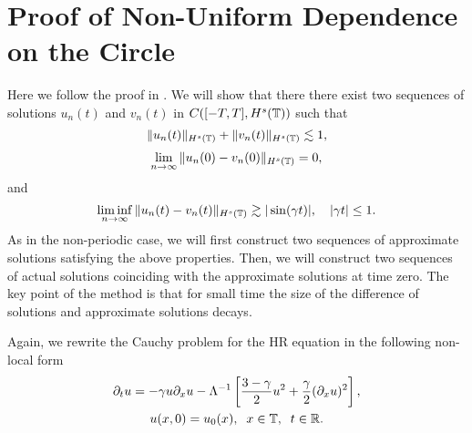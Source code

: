 \section{Proof of Non-Uniform Dependence 
on the Circle}
\label{sec:3}
%
Here we follow the proof in \cite{Himonas:2010}. 
We will show that there there exist two sequences of solutions 
$u_n(t)$
and $v_n(t)$ in $C([-T, T], H^s(\mathbb{T}))$ such that
%
%
%
%
\begin{equation}
\| u_n(t)  \|_{H^s(\mathbb{T})}
+
\| v_n(t)  \|_{H^s(\mathbb{T})}
\lesssim
1,
\end{equation}
%
%
%
%
%
\begin{equation}
\lim_{n\to\infty}
\|
u_n(0)
-
v_n(0)
\|_{H^s(\mathbb{T})}
=
0,
\end{equation}
%
%
%
%
and
%
%
%
%
\begin{equation}
\label{bdd-away-from-0}
\liminf_{n\to\infty}
\|
u_n(t)
-
v_n(t)
\|_{H^s(\mathbb{T})}
\gtrsim
|\sin ( \gamma t)|,
\quad
| \gamma t|\le 1.
\end{equation}%
%
%
As in the non-periodic case, we will first construct two sequences of approximate solutions
satisfying the above properties.
Then, we will construct two sequences of actual solutions 
coinciding with the approximate solutions at time zero.
The key point of the method is that 
for small time the size of the difference of solutions and approximate solutions decays.

Again, we rewrite the Cauchy problem for the HR equation 
in the following non-local form
%
%
%
\begin{gather}
\partial_t u = -\gamma u \partial_x u  - \Lambda^{-1} \left[ \frac{3 - 
\gamma}{2}u^2 +
\frac{\gamma}{2}(\partial_x u)^2 \right] ,
\label{hyperelastic-rod-equation}
\\
u(x,0) = u_0(x), \; \; x \in \mathbb{T}, \; \; t \in \mathbb{R}.  \label{init-cond}
\end{gather}
%
%
